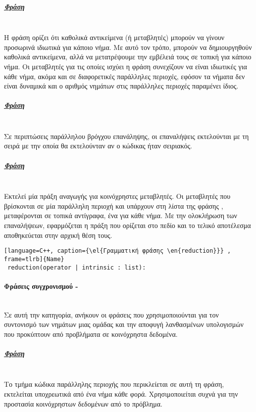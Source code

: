\subparagraph{\underline{Φράση }}
\ \\
Η φράση \emph{} ορίζει ότι καθολικά αντικείμενα (ή μεταβλητές) μπορούν να γίνουν προσωρινά ιδιωτικά
για κάποιο νήμα. Με αυτό τον τρόπο, μπορούν να δημιουργηθούν καθολικά αντικείμενα, αλλά να μετατρέψουμε την εμβέλειά τους
σε τοπική για κάποιο νήμα. Οι μεταβλητές για τις οποίες ισχύει η φράση \emph{} συνεχίζουν να είναι
ιδιωτικές για κάθε νήμα, ακόμα και σε διαφορετικές παράλληλες περιοχές, εφόσον τα νήματα δεν είναι δυναμικά και ο αριθμός νημάτων στις παράλληλες περιοχές παραμένει ίδιος\cite{threadprivate}.
\\
\subparagraph{\underline{Φράση }}
\ \\
Σε περιπτώσεις παράλληλου βρόγχου επανάληψης, οι επαναλήψεις εκτελούνται με τη σειρά με την οποία θα εκτελούνταν αν ο
κώδικας ήταν σειριακός.

\subparagraph{\underline{Φράση }}
\ \\
Εκτελεί μία πράξη αναγωγής για κοινόχρηστες μεταβλητές. Οι μεταβλητές που βρίσκονται σε μία παράλληλη περιοχή και
υπάρχουν στη λίστα της φράσης \emph{}, μεταφέρονται σε τοπικά αντίγραφα, ένα για κάθε νήμα. Με την
ολοκλήρωση των επαναλήψεων, εφαρμόζεται η πράξη που ορίζεται στο πεδίο \emph{} και το τελικό αποτέλεσμα
αποθηκεύεται στην αρχική θέση τους\cite{pdplab}.

\begin{lstlisting}[language=C++, caption={\el{Γραμματική φράσης \en{reduction}}} , frame=tlrb]{Name}
 reduction(operator | intrinsic : list):\end{lstlisting}




\paragraph{Φράσεις συγχρονισμού - \emph{}}
\ \\
Σε αυτή την κατηγορία, ανήκουν οι φράσεις που χρησιμοποιούνται για τον συντονισμό των νημάτων μιας ομάδας και την
αποφυγή λανθασμένων υπολογισμών που προκύπτουν από προβλήματα \textbf{} σε κοινόχρηστα δεδομένα.

\subparagraph{\underline{Φράση }}
\ \\
Το τμήμα κώδικα παράλληλης περιοχής που περικλείεται σε αυτή τη φράση, εκτελείται υποχρεωτικά από ένα νήμα κάθε φορά.
Χρησιμοποιείται συχνά για την προστασία κοινόχρηστων δεδομένων από το \emph{} πρόβλημα.

